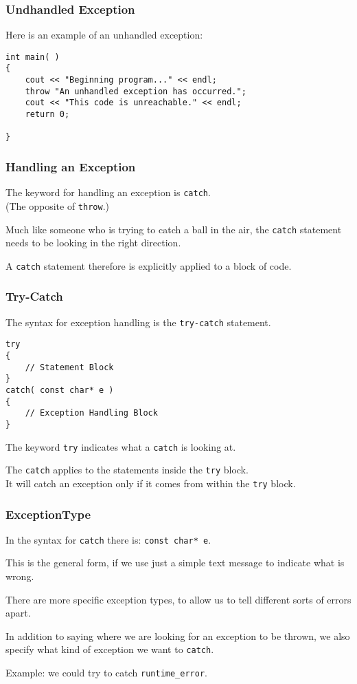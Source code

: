 \begin{frame}[fragile]
\frametitle{Undhandled Exception}

Here is an example of an unhandled exception:

\begin{verbatim}
int main( )
{
    cout << "Beginning program..." << endl;
    throw "An unhandled exception has occurred.";
    cout << "This code is unreachable." << endl;
    return 0;
    
}
\end{verbatim}


\end{frame}


\begin{frame}
\frametitle{Handling an Exception}

The keyword for handling an exception is \texttt{catch}.\\
\quad (The opposite of \texttt{throw}.)

Much like someone who is trying to catch a ball in the air, the \texttt{catch} statement needs to be looking in the right direction.

A \texttt{catch} statement therefore is explicitly applied to a block of code.

\end{frame}

\begin{frame}[fragile]
\frametitle{Try-Catch}
The syntax for exception handling is the \texttt{try-catch} statement.

\begin{verbatim}
try
{
    // Statement Block
}
catch( const char* e )
{
    // Exception Handling Block
}    
\end{verbatim}

The keyword \texttt{try} indicates what a \texttt{catch} is looking at.

The \texttt{catch} applies to the statements inside the \texttt{try} block.\\
\quad It will catch an exception only if it comes from within the \texttt{try} block.

\end{frame}

\begin{frame}
\frametitle{ExceptionType}

In the syntax for \texttt{catch} there is: \texttt{const char* e}.

This is the general form, if we use just a simple text message to indicate what is wrong.

There are more specific exception types, to allow us to tell different sorts of errors apart.

In addition to saying where we are looking for an exception to be thrown, we also specify what kind of exception we want to \texttt{catch}.

Example: we could try to catch \texttt{runtime\_error}.

\end{frame}

